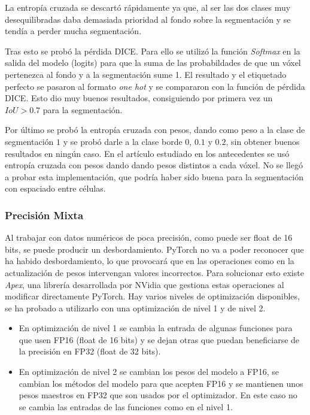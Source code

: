 La entropía cruzada se descartó rápidamente ya que, al ser las dos clases muy desequilibradas daba demasiada prioridad al fondo sobre la segmentación y se tendía a perder mucha segmentación. 

Tras esto se probó la pérdida DICE. Para ello se utilizó la función \textit{Softmax} en la salida del modelo (logits) para que la suma de las probabildades de que un vóxel pertenezca al fondo y a la segmentación sume 1. El resultado y el etiquetado perfecto se pasaron al formato \textit{one hot} y se compararon con la función de pérdida DICE. Esto dio muy buenos resultados, consiguiendo por primera vez un $IoU>0.7$ para la segmentación.

Por último se probó la entropía cruzada con pesos, dando como peso a la clase de segmentación $1$ y se probó darle a la clase borde $0$, $0.1$ y $0.2$, sin obtener buenos resultados en ningún caso. En el artículo estudiado en los antecedentes \cite{Falk2019} se usó entropía cruzada con pesos dando dando pesos distintos a cada vóxel. No se llegó a probar esta implementación, que podría haber sido buena para la segmentación con espaciado entre células.

\subsubsection{Precisión Mixta}

Al trabajar con datos numéricos de poca precisión, como puede ser float de 16 bits, se puede producir un desbordamiento. PyTorch no va a poder reconocer que ha habido desbordamiento, lo que provocará que en las operaciones como en la actualización de pesos intervengan valores incorrectos. Para solucionar esto existe \textit{Apex}, una librería desarrollada por NVidia que gestiona estas operaciones al modificar directamente PyTorch. Hay varios niveles de optimización disponibles, se ha probado a utilizarlo con una optimización de nivel 1 y de nivel 2.
\begin{itemize}
\item En optimización de nivel 1 se cambia la entrada de algunas funciones para que usen FP16 (float de 16 bits) y se dejan otras que puedan beneficiarse de la precisión en FP32 (float de 32 bits).
\item En optimización de nivel 2 se cambian los pesos del modelo a FP16, se cambian los métodos del modelo para que acepten FP16 y se mantienen unos pesos maestros en FP32 que son usados por el optimizador. En este caso no se cambia las entradas de las funciones como en el nivel 1.
\end{itemize}


